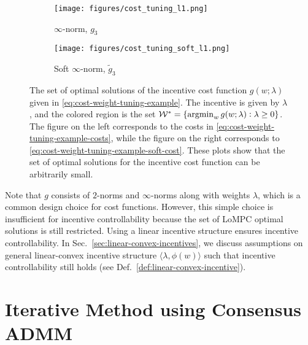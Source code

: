 \begin{figure}%
    \centering
    \begin{subfigure}[t]{0.49\linewidth}
        \centering
        \texttt{[image: figures/cost\_tuning\_l1.png]}
        \caption{$\infty$-norm, $g_3$}
        \label{subfig:cost-weight-tuning-example-inf-norm}
    \end{subfigure}
    \begin{subfigure}[t]{0.49\linewidth}
        \centering
        \texttt{[image: figures/cost\_tuning\_soft\_l1.png]}
        \caption{Soft $\infty$-norm, $\tilde{g}_3$}
        \label{subfig:cost-weight-tuning-example-soft-inf-norm}
    \end{subfigure}
    \caption{The set of optimal solutions of the incentive cost function $g(w; \lambda)$ given in \eqref{eq:cost-weight-tuning-example}.
    The incentive is given by $\lambda$, and the colored region is the set $\mathcal{W}^* = \{\operatorname*{argmin}_w g(w; \lambda): \lambda \geq 0\}$.
    The figure on the left corresponds to the costs in \eqref{eq:cost-weight-tuning-example-costs}, while the figure on the right corresponds to \eqref{eq:cost-weight-tuning-example-soft-cost}.
    These plots show that the set of optimal solutions for the incentive cost function can be arbitrarily small.
    }
    \vspace{-5pt}
    \label{fig:cost-weight-tuning-example}
\end{figure}

Note that $g$ consists of $2$-norms and $\infty$-norms along with weights $\lambda$, which is a common design choice for cost functions.
However, this simple choice is insufficient for incentive controllability because the set of LoMPC optimal solutions is still restricted.
Using a linear incentive structure ensures incentive controllability. %
In Sec.~\ref{sec:linear-convex-incentives}, we discuss assumptions on general linear-convex incentive structure $\langle \lambda, \phi(w) \rangle$ such that incentive controllability still holds (see Def.~\ref{def:linear-convex-incentive}).

\fi

\iffalse
\section{Iterative Method using Consensus ADMM}
\label{app:iterative-method-consensus-admm}

